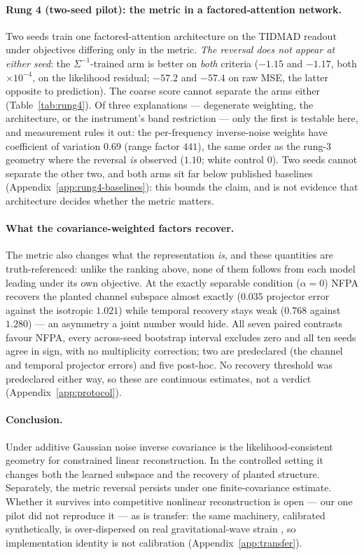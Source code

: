 \paragraph{Rung 4 (two-seed pilot): the metric in a factored-attention network.}
Two seeds train one factored-attention architecture on the TIDMAD readout under objectives differing only in the metric. \emph{The reversal does not appear at either seed}: the $\Sigma^{-1}$-trained arm is better on \emph{both} criteria ($-1.15$ and $-1.17$, both $\times10^{-4}$, on the likelihood residual; $-57.2$ and $-57.4$ on raw MSE, the latter opposite to prediction). The coarse score cannot separate the arms either (Table~\ref{tab:rung4}). Of three explanations --- degenerate weighting, the architecture, or the instrument's band restriction --- only the first is testable here, and measurement rules it out: the per-frequency inverse-noise weights have coefficient of variation $0.69$ (range factor $441$), the same order as the rung-3 geometry where the reversal \emph{is} observed ($1.10$; white control $0$). Two seeds cannot separate the other two, and both arms sit far below published baselines (Appendix~\ref{app:rung4-baselines}): this bounds the claim, and is not evidence that architecture decides whether the metric matters.

\paragraph{What the covariance-weighted factors recover.}
The metric also changes what the representation \emph{is}, and these quantities are truth-referenced: unlike the ranking above, none of them follows from each model leading under its own objective. At the exactly separable condition ($\alpha=0$) NFPA recovers the planted channel subspace almost exactly ($0.035$ projector error against the isotropic $1.021$) while temporal recovery stays weak ($0.768$ against $1.280$) --- an asymmetry a joint number would hide. All seven paired contrasts favour NFPA, every across-seed bootstrap interval excludes zero and all ten seeds agree in sign, with no multiplicity correction; two are predeclared (the channel and temporal projector errors) and five post-hoc. No recovery threshold was predeclared either way, so these are continuous estimates, not a verdict (Appendix~\ref{app:protocol}).

\paragraph{Conclusion.}
Under additive Gaussian noise inverse covariance is the likelihood-consistent geometry for constrained linear reconstruction. In the controlled setting it changes both the learned subspace and the recovery of planted structure. Separately, the metric reversal persists under one finite-covariance estimate. Whether it survives into competitive nonlinear reconstruction is open --- our one pilot did not reproduce it --- as is transfer: the same machinery, calibrated synthetically, is over-dispersed on real gravitational-wave strain \citep{gwoscgw150914,macleod2021gwpy}, so implementation identity is not calibration (Appendix~\ref{app:transfer}).
